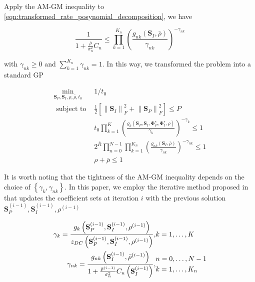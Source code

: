 Apply the AM-GM inequality to \ref{eqn:transformed_rate_posynomial_decomposition}, we have

\begin{equation}\label{eqn:transformed_rate_am_gm}
  \frac{1}{{1 + \frac{{\bar \rho }}{{\sigma _n^2}}{C_n}}} \leqslant \prod\limits_{k = 1}^{{K_n}} {{{\left( {\frac{{{g_{nk}}\left( {{{\mathbf{S}}_I},\bar \rho } \right)}}{{{\gamma _{nk}}}}} \right)}^{ - {\gamma _{nk}}}}} 
\end{equation}

with ${\gamma _{nk}} \geqslant 0$ and $\sum\nolimits_{k = 1}^{{K_n}} {{\gamma _{nk}}}  = 1$. In this way, we transformed the problem into a standard GP

\begin{eqnarray}
  {\mathop {\min }\limits_{{{\mathbf{S}}_P},{{\mathbf{S}}_I},\rho ,\bar \rho ,{t_0}} }&{1/{t_0}} \label{eqn:general_target} \\
  {{\text{ subject to }}}&{\frac{1}{2}\left[ {\left\| {{{\mathbf{S}}_I}} \right\|_F^2 + \left\| {{{\mathbf{S}}_P}} \right\|_F^2} \right] \leqslant P} \label{eqn:general_power_constraint} \\
  {}&{{t_0}\prod\limits_{k = 1}^K {{{\left( {\frac{{{g_k}\left( {{{\mathbf{S}}_P},{{\mathbf{S}}_I},{\mathbf{\Phi }}_P^ \star ,{\mathbf{\Phi }}_I^ \star ,\rho } \right)}}{{{\gamma _k}}}} \right)}^{ - {\gamma _k}}}}  \leqslant 1} \label{eqn:general_current_constraint} \\
  {}&{2^{\bar R}}\prod\limits_{n = 0}^{N - 1} {\prod\limits_{k = 1}^{{K_n}} {{{\left( {\frac{{{g_{nk}}\left( {{{\mathbf{S}}_I},\bar \rho } \right)}}{{{\gamma _{nk}}}}} \right)}^{ - {\gamma _{nk}}}}} }  \leqslant 1 \label{eqn:general_rate_constraint} \\
  {}&{\rho  + \bar \rho  \leqslant 1} \label{eqn:general_ratio_constraint} 
\end{eqnarray}

It is worth noting that the tightness of the AM-GM inequality depends on the choice of $\left\{ {{\gamma _k},{\gamma _{nk}}} \right\}$. In this paper, we employ the iterative method proposed in \cite{Clerckx2018} that updates the coefficient sets at iteration $i$ with the previous solution ${{\mathbf{S}}_P^{(i - 1)},{\mathbf{S}}_I^{(i - 1)},{\rho ^{(i - 1)}}}$

\begin{eqnarray}
  {{\gamma _k} = \frac{{{g_k}\left( {{\mathbf{S}}_P^{(i - 1)},{\mathbf{S}}_I^{(i - 1)},{\rho ^{(i - 1)}}} \right)}}{{{z_{DC}}\left( {{\mathbf{S}}_P^{(i - 1)},{\mathbf{S}}_I^{(i - 1)},{\rho ^{(i - 1)}}} \right)}},}&{k = 1, \ldots ,K} \\
  {{\gamma _{nk}} = \frac{{{g_{nk}}\left( {{\mathbf{S}}_I^{(i - 1)},{{\bar \rho }^{(i - 1)}}} \right)}}{{1 + \frac{{{{\bar \rho }^{(i - 1)}}}}{{\sigma _n^2}}{C_n}\left( {{\mathbf{S}}_I^{(i - 1)}} \right)}},}&\begin{gathered}
  n = 0, \ldots ,N - 1 \hfill \\
  k = 1, \ldots ,{K_n} \hfill \\
\end{gathered}
\end{eqnarray}

